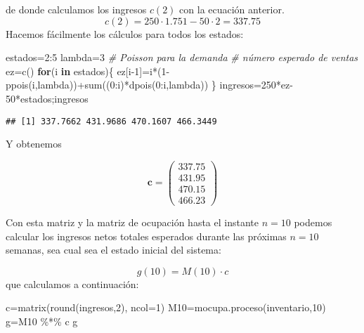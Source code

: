 \documentclass[
]{book}
\newenvironment{Shaded}{\begin{snugshade}}{\end{snugshade}}
\newcommand{\AttributeTok}[1]{\textcolor[rgb]{0.77,0.63,0.00}{#1}}
\newcommand{\CommentTok}[1]{\textcolor[rgb]{0.56,0.35,0.01}{\textit{#1}}}
\newcommand{\ControlFlowTok}[1]{\textcolor[rgb]{0.13,0.29,0.53}{\textbf{#1}}}
\newcommand{\DecValTok}[1]{\textcolor[rgb]{0.00,0.00,0.81}{#1}}
\newcommand{\FunctionTok}[1]{\textcolor[rgb]{0.00,0.00,0.00}{#1}}
\newcommand{\NormalTok}[1]{#1}
\newcommand{\OtherTok}[1]{\textcolor[rgb]{0.56,0.35,0.01}{#1}}
\newcommand{\SpecialCharTok}[1]{\textcolor[rgb]{0.00,0.00,0.00}{#1}}
\theoremstyle{definition}
\theoremstyle{definition}
\theoremstyle{definition}
\theoremstyle{definition}
\theoremstyle{remark}
\begin{document}
de donde calculamos los ingresos \(c(2)\) con la ecuación anterior.
\[c(2) =  250 \cdot 1.751 -50 \cdot 2 = 337.75\]
Hacemos fácilmente los cálculos para todos los estados:

\begin{Shaded}
\begin{Highlighting}[]
\NormalTok{estados}\OtherTok{=}\DecValTok{2}\SpecialCharTok{:}\DecValTok{5}
\NormalTok{lambda}\OtherTok{=}\DecValTok{3}   \CommentTok{\# Poisson para la demanda}
\CommentTok{\# número esperado de ventas}
\NormalTok{ez}\OtherTok{=}\FunctionTok{c}\NormalTok{()}
\ControlFlowTok{for}\NormalTok{(i }\ControlFlowTok{in}\NormalTok{ estados)\{}
\NormalTok{ez[i}\DecValTok{{-}1}\NormalTok{]}\OtherTok{=}\NormalTok{i}\SpecialCharTok{*}\NormalTok{(}\DecValTok{1}\SpecialCharTok{{-}}\FunctionTok{ppois}\NormalTok{(i,lambda))}\SpecialCharTok{+}\FunctionTok{sum}\NormalTok{((}\DecValTok{0}\SpecialCharTok{:}\NormalTok{i)}\SpecialCharTok{*}\FunctionTok{dpois}\NormalTok{(}\DecValTok{0}\SpecialCharTok{:}\NormalTok{i,lambda))}
\NormalTok{\}}
\NormalTok{ingresos}\OtherTok{=}\DecValTok{250}\SpecialCharTok{*}\NormalTok{ez}\DecValTok{{-}50}\SpecialCharTok{*}\NormalTok{estados;ingresos}
\end{Highlighting}
\end{Shaded}

\begin{verbatim}
## [1] 337.7662 431.9686 470.1607 466.3449
\end{verbatim}

Y obtenemos

\[\mathbf{c} = 
\begin{pmatrix}
337.75 \\
431.95 \\
470.15 \\
466.23 
\end{pmatrix}\]

Con esta matriz y la matriz de ocupación hasta el instante \(n=10\) podemos calcular los ingresos netos totales esperados durante las próximas \(n=10\) semanas, sea cual sea el estado inicial del sistema:

\[g(10)=M(10) \cdot c\]
que calculamos a continuación:

\begin{Shaded}
\begin{Highlighting}[]
\NormalTok{c}\OtherTok{=}\FunctionTok{matrix}\NormalTok{(}\FunctionTok{round}\NormalTok{(ingresos,}\DecValTok{2}\NormalTok{), }\AttributeTok{ncol=}\DecValTok{1}\NormalTok{)}
\NormalTok{M10}\OtherTok{=}\FunctionTok{mocupa.proceso}\NormalTok{(inventario,}\DecValTok{10}\NormalTok{)}
\NormalTok{g}\OtherTok{=}\NormalTok{M10 }\SpecialCharTok{\%*\%}\NormalTok{ c}
\NormalTok{g}
\end{Highlighting}
\end{Shaded}
\end{document}
